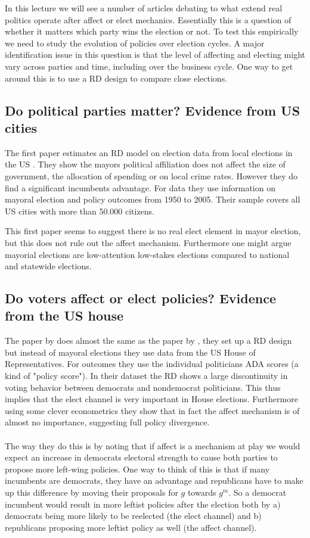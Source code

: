 In this lecture we will see a number of articles debating to what extend real politics operate after affect or elect mechanics. Essentially this is a question of whether it matters which party wins the election or not. To test this empirically we need to study the evolution of policies over election cycles. A major identification issue in this question is that the level of affecting and electing might vary across parties and time, including over the business cycle. One way to get around this is to use a RD design to compare close elections.

\subsection{Do political parties matter? Evidence from US cities}
The first paper estimates an RD model on election data from local elections in the US \citep{ferreira_political_2007}. They show the mayors political affiliation does not affect the size of government, the allocation of spending or on local crime rates. However they do find a significant incumbents advantage. For data they use information on mayoral election and policy outcomes from 1950 to 2005. Their sample covers all US cities with more than 50.000 citizens. 

This first paper seems to suggest there is no real elect element in mayor election, but this does not rule out the affect mechanism. Furthermore one might argue mayorial elections are low-attention low-stakes elections compared to national and statewide elections. 

\subsection{Do voters affect or elect policies? Evidence from the US house}
The paper by \cite{lee_voters_2004} does almost the same as the paper by \citeauthor{ferreira_political_2007}, they set up a RD design but instead of mayoral elections they use data from the US House of Representatives. For outcomes they use the individual politicians ADA scores (a kind of "policy score"). In their dataset the RD shows a large discontinuity in voting behavior between democrats and nondemocrat politicians. This thus implies that the elect channel is very important in House elections. Furthermore using some clever econometrics they show that in fact the affect mechanism is of almost no importance, suggesting full policy divergence. 
\\ \\
The way they do this is by noting that if affect is a mechanism at play we would expect an increase in democrats electoral strength to cause both parties to propose more left-wing policies. One way to think of this is that if many incumbents are democrats, they have an advantage and republicans have to make up this difference by moving their proposals for $g$ towards $g^m$. So a democrat incumbent would result in more leftist policies after the election both by a) democrats being more likely to be reelected (the elect channel) and b) republicans proposing more leftist policy as well (the affect channel). 

